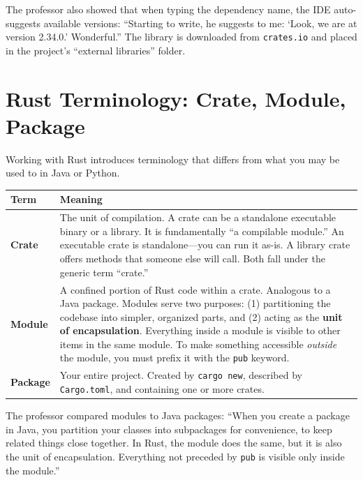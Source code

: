 The professor also showed that when typing the dependency name, the IDE auto-suggests available versions: ``Starting to write, he suggests to me: `Look, we are at version 2.34.0.' Wonderful.'' The library is downloaded from \texttt{crates.io} and placed in the project's ``external libraries'' folder.

\section{Rust Terminology: Crate, Module, Package}

Working with Rust introduces terminology that differs from what you may be used to in Java or Python.

\begin{center}
\begin{tabular}{|l|p{10cm}|}
\hline
\textbf{Term} & \textbf{Meaning} \\
\hline
\textbf{Crate} & The unit of compilation. A crate can be a standalone executable binary or a library. It is fundamentally ``a compilable module.'' An executable crate is standalone---you can run it as-is. A library crate offers methods that someone else will call. Both fall under the generic term ``crate.'' \\
\hline
\textbf{Module} & A confined portion of Rust code within a crate. Analogous to a Java package. Modules serve two purposes: (1) partitioning the codebase into simpler, organized parts, and (2) acting as the \textbf{unit of encapsulation}. Everything inside a module is visible to other items in the same module. To make something accessible \emph{outside} the module, you must prefix it with the \texttt{pub} keyword. \\
\hline
\textbf{Package} & Your entire project. Created by \texttt{cargo new}, described by \texttt{Cargo.toml}, and containing one or more crates. \\
\hline
\end{tabular}
\end{center}

\begin{insightbox}
The professor compared modules to Java packages: ``When you create a package in Java, you partition your classes into subpackages for convenience, to keep related things close together. In Rust, the module does the same, but it is also the unit of encapsulation. Everything not preceded by \texttt{pub} is visible only inside the module.''
\end{insightbox}

